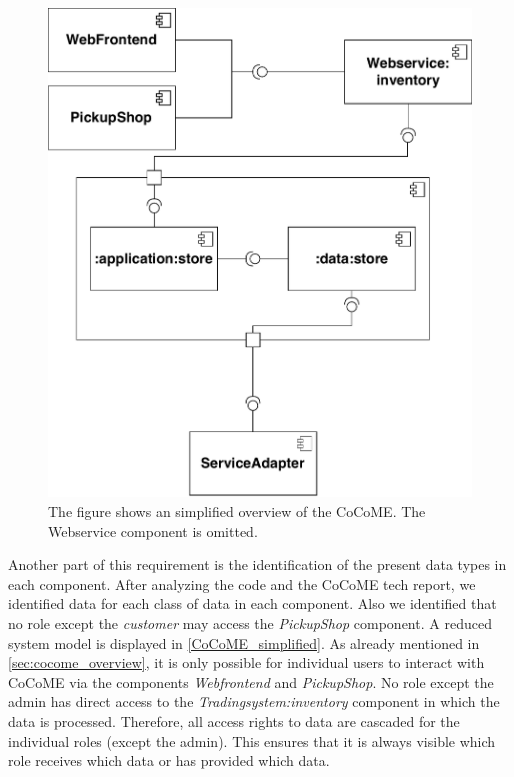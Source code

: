 \begin{figure}
\includegraphics[scale=.8]{logos/ExcerptRelComps.pdf}
\caption{The figure shows an simplified overview of the CoCoME. The Webservice component is omitted.}
\label{CoCoME_simplified}
\end{figure}
Another part of this requirement is the identification of the present data types in each component. After analyzing the code and the CoCoME tech report, we identified data for each class of data in each component. Also we identified that no role except the \textit{customer} may access the \textit{PickupShop} component. A  reduced system model is displayed in \autoref{CoCoME_simplified}. As already mentioned in \autoref{sec:cocome_overview}, it is only possible for individual users to interact with CoCoME via the components \textit{Webfrontend} and \textit{PickupShop}. No role except the admin has direct access to the \textit{Tradingsystem:inventory} component in which the data is processed. Therefore, all access rights to data are cascaded for the individual roles (except the admin). This ensures that it is always visible which role receives which data or has provided which data. \\
